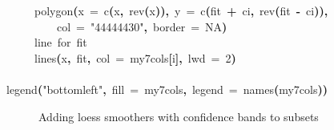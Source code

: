 \documentclass[a4paper]{article}
\newcommand{\hlnumber}[1]{\textcolor[rgb]{0.0823529411764706,0.0784313725490196,0.709803921568627}{#1}}%
\newcommand{\hlfunctioncall}[1]{\textcolor[rgb]{1,0,0}{#1}}%
\newcommand{\hlstring}[1]{\textcolor[rgb]{0.6,0.6,1}{#1}}%
\newcommand{\hlkeyword}[1]{\textcolor[rgb]{0,0,0}{\textbf{#1}}}%
\newcommand{\hlargument}[1]{\textcolor[rgb]{0.694117647058824,0.247058823529412,0.0196078431372549}{#1}}%
\newcommand{\hlcomment}[1]{\textcolor[rgb]{0.8,0.8,0.8}{#1}}%
\newcommand{\hlsymbol}[1]{\textcolor[rgb]{0,0,0}{#1}}%
\newcommand{\hlprompt}[1]{\textcolor[rgb]{0,0,0}{#1}}%
\newcommand{\hlstd}[1]{\textcolor[rgb]{0,0,0}{#1}}%
\newenvironment{Houtput}{\raggedright}{%
%
}
\begin{document}
\begin{Houtput}
\hlstd{}\hlprompt{{\ }}{\ }{\ }{\ }{\ }\hlfunctioncall{polygon}\hlkeyword{(}\hlargument{x}{\ }\hlargument{=}{\ }\hlfunctioncall{c}\hlkeyword{(}\hlsymbol{x}\hlkeyword{,}{\ }\hlfunctioncall{rev}\hlkeyword{(}\hlsymbol{x}\hlkeyword{)}\hlkeyword{)}\hlkeyword{,}{\ }\hlargument{y}{\ }\hlargument{=}{\ }\hlfunctioncall{c}\hlkeyword{(}\hlsymbol{fit}{\ }\hlkeyword{+}{\ }\hlsymbol{ci}\hlkeyword{,}{\ }\hlfunctioncall{rev}\hlkeyword{(}\hlsymbol{fit}{\ }\hlkeyword{-}{\ }\hlsymbol{ci}\hlkeyword{)}\hlkeyword{)}\hlkeyword{,}\hspace*{\fill}\\
\hlstd{}\hlprompt{{\ }}{\ }{\ }{\ }{\ }{\ }{\ }{\ }{\ }\hlargument{col}{\ }\hlargument{=}{\ }\hlstring{"\usebox{\hlnormalsizeboxhash}44444430"}\hlkeyword{,}{\ }\hlargument{border}{\ }\hlargument{=}{\ }\hlnumber{NA}\hlkeyword{)}\hspace*{\fill}\\
\hlstd{}\hlprompt{{\ }}{\ }{\ }{\ }{\ }\hlcomment{\usebox{\hlnormalsizeboxhash}{\ }line{\ }for{\ }fit}\hspace*{\fill}\\
\hlstd{}\hlprompt{{\ }}{\ }{\ }{\ }{\ }\hlfunctioncall{lines}\hlkeyword{(}\hlsymbol{x}\hlkeyword{,}{\ }\hlsymbol{fit}\hlkeyword{,}{\ }\hlargument{col}{\ }\hlargument{=}{\ }\hlsymbol{my7cols}\hlkeyword{[}\hlsymbol{i}\hlkeyword{]}\hlkeyword{,}{\ }\hlargument{lwd}{\ }\hlargument{=}{\ }\hlnumber{2}\hlkeyword{)}\hspace*{\fill}\\
\hlstd{}\hlprompt{{\ }}\hlkeyword{\usebox{\hlnormalsizeboxclosebrace}}\mbox{}
\normalfont
\hspace*{\fill}\\
\hlstd{}\ttfamily\noindent
\hlprompt{\usebox{\hlnormalsizeboxgreaterthan}{\ }}\hlfunctioncall{legend}\hlkeyword{(}\hlstring{"bottomleft"}\hlkeyword{,}{\ }\hlargument{fill}{\ }\hlargument{=}{\ }\hlsymbol{my7cols}\hlkeyword{,}{\ }\hlargument{legend}{\ }\hlargument{=}{\ }\hlfunctioncall{names}\hlkeyword{(}\hlsymbol{my7cols}\hlkeyword{)}\hlkeyword{)}\mbox{}
\normalfont
\hspace*{\fill}\\
\hlstd{}
\end{Houtput}

\begin{figure}[H]
\centering

{\tikzexternaldisable

}
\caption{Adding loess smoothers with confidence bands to subsets}
\end{figure}
\end{document}
